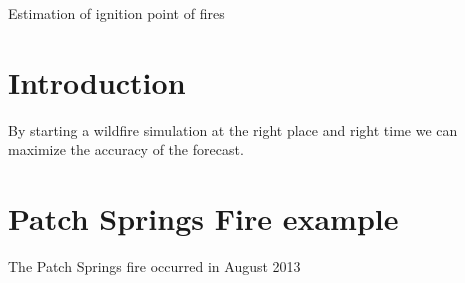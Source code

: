 \documentclass[11pt,letterpaper]{report}
\begin{document}
\begin{center}
Estimation of ignition point of fires
\end{center}

\section{Introduction}
By starting a wildfire simulation at the right place and right time we can maximize the accuracy  of the forecast.

\section{Patch Springs Fire example}
The Patch Springs fire occurred in August 2013
\end{document}
